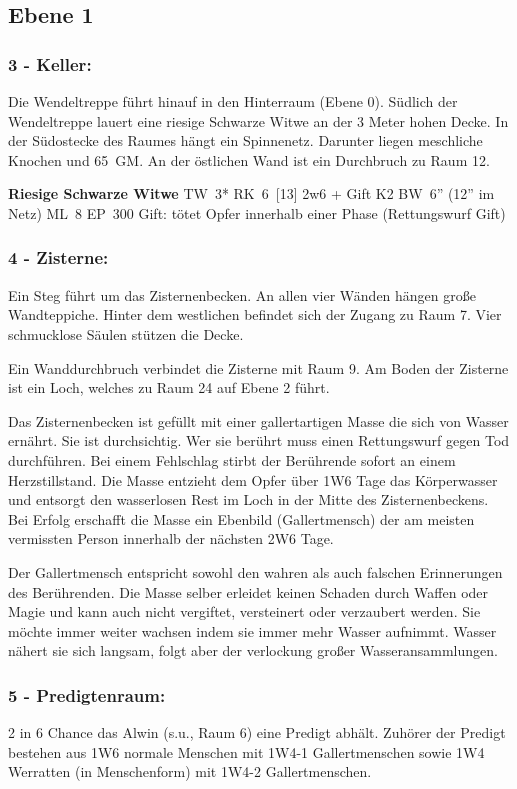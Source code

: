 \subsection{Ebene 1}

\subsubsection{3 - Keller:} Die Wendeltreppe führt hinauf in den Hinterraum
(Ebene 0). Südlich der Wendeltreppe lauert eine riesige Schwarze Witwe an der 3
Meter hohen Decke.  In der Südostecke des Raumes hängt ein Spinnenetz. Darunter
liegen meschliche Knochen und 65~GM. An der östlichen Wand ist ein Durchbruch
zu Raum 12.

\textbf{Riesige Schwarze Witwe} TW~3* RK~6~[13] 2w6 + Gift K2 BW~6'' (12''
im Netz) ML~8 EP~300 
Gift: tötet Opfer innerhalb einer Phase (Rettungswurf Gift)

\subsubsection{4 - Zisterne:} Ein Steg führt um das Zisternenbecken. An allen
vier Wänden hängen große Wandteppiche. Hinter dem westlichen befindet sich der
Zugang zu Raum 7. Vier schmucklose Säulen stützen die Decke. 


Ein Wanddurchbruch
verbindet die Zisterne mit Raum 9. Am Boden der Zisterne ist ein
Loch, welches zu Raum 24 auf Ebene 2 führt.

Das Zisternenbecken ist gefüllt mit einer gallertartigen Masse die sich von
Wasser ernährt. Sie ist durchsichtig. Wer sie berührt muss einen Rettungswurf
gegen Tod durchführen. Bei einem Fehlschlag stirbt der Berührende sofort an
einem Herzstillstand. Die Masse entzieht dem Opfer über 1W6 Tage das
Körperwasser und entsorgt den wasserlosen Rest im Loch in der Mitte des
Zisternenbeckens. Bei Erfolg erschafft die Masse ein Ebenbild (Gallertmensch)
der am meisten vermissten Person innerhalb der nächsten 2W6 Tage.

Der Gallertmensch entspricht sowohl den wahren als auch falschen Erinnerungen
des Berührenden.  Die Masse selber erleidet keinen Schaden durch Waffen oder
Magie und kann auch nicht vergiftet, versteinert oder verzaubert werden. Sie
möchte immer weiter wachsen indem sie immer mehr Wasser aufnimmt. Wasser nähert
sie sich langsam, folgt aber der verlockung großer Wasseransammlungen.

\subsubsection{5 - Predigtenraum:} 2 in 6 Chance das Alwin (s.u., Raum 6) eine
Predigt abhält. Zuhörer der Predigt bestehen aus 1W6 normale Menschen mit 1W4-1
Gallertmenschen sowie 1W4 Werratten (in Menschenform) mit 1W4-2
Gallertmenschen.

